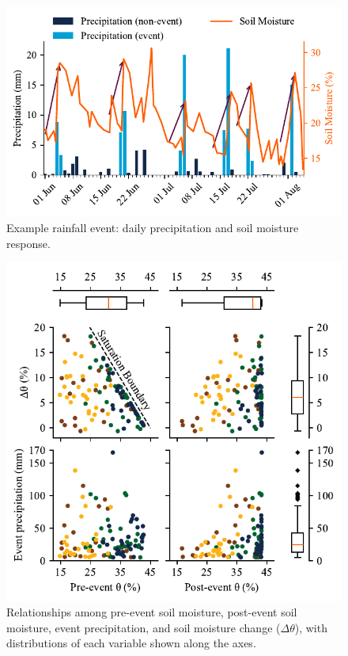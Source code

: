 \documentclass[9pt, twocolumn]{extarticle}
\begin{document}
\begin{figure}[!h] %
  \centering
  \includegraphics[width=\columnwidth]{sample events}
  \caption{Example rainfall event: daily precipitation and soil moisture response.}
  \label{fig:sample_events}
\end{figure}

\begin{figure}[!h] %
  \centering
  \includegraphics[width=\columnwidth]{dt events}
  \caption{Relationships among pre-event soil moisture, post-event soil moisture, event precipitation, and soil moisture change ($\Delta \theta$), with distributions of each variable shown along the axes.}
  \label{fig:dt_events}
\end{figure}

\printbibliography
\end{document}
